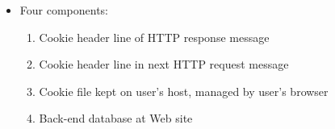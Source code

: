 \begin{itemize}
\begin{itemize}
      \item Four components:

        \begin{enumerate}

          \item Cookie header line of HTTP response message

          \item Cookie header line in next HTTP request message

          \item Cookie file kept on user's host, managed by user's browser

          \item Back-end database at Web site

        \end{enumerate}

    \end{itemize}

\end{itemize}



